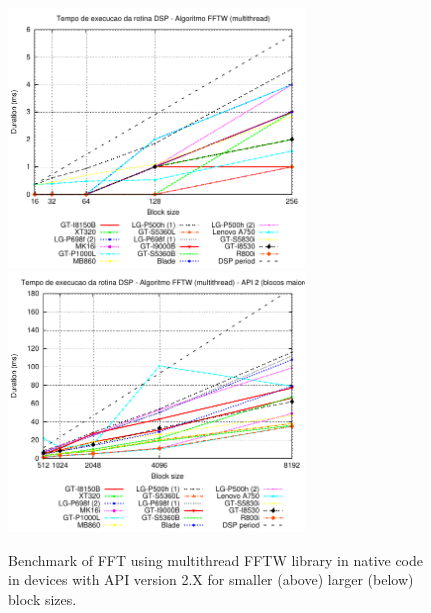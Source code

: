 \documentclass[12pt]{article}
\begin{document}
\begin{figure}[h!]
\begin{center}
\includegraphics[width=0.7\textwidth]{img/FFTW_MULTI-2-a.pdf}
\includegraphics[width=0.7\textwidth]{img/FFTW_MULTI-2-b.pdf}
\end{center}
\caption{Benchmark of FFT using multithread FFTW library in native code in
devices with API version 2.X for smaller (above) larger (below) block sizes.}
\label{fig:alg-fftw-multi}
\end{figure}
\end{document}
